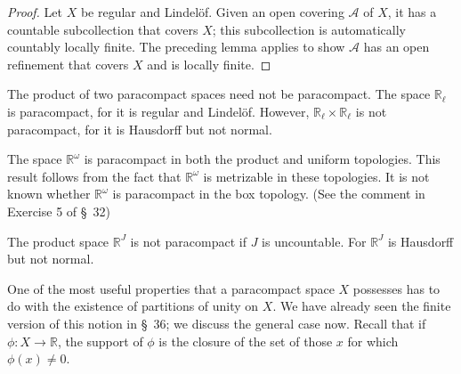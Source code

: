 \begin{proof}
 Let \(X\) be regular and Lindelöf. Given an open covering \(\mathcal{A}\) of \(X\), it has a countable subcollection that covers \(X\); this subcollection is automatically countably locally finite. The preceding lemma applies to show \(\mathcal{A}\) has an open refinement that covers \(X\) and is locally finite.
\end{proof}

\begin{centeredblock}
\begin{example}
\label{ex:\thesection.\theexample}
 The product of two paracompact spaces need not be paracompact. The space \(\mathbb{R}_{\ell }\) is paracompact, for it is regular and Lindelöf. However, \(\mathbb{R}_{\ell } \times {\mathbb{R}}_{\ell }\) is not paracompact, for it is Hausdorff but not normal.
\end{example}
\end{centeredblock}

\begin{centeredblock}
\begin{example}
\label{ex:\thesection.\theexample}
 The space \(\mathbb{R}^{\omega }\) is paracompact in both the product and uniform topologies. This result follows from the fact that \(\mathbb{R}^{\omega }\) is metrizable in these topologies. It is not known whether \(\mathbb{R}^{\omega }\) is paracompact in the box topology. (See the comment in Exercise 5 of \S\ 32)
\end{example}
\end{centeredblock}

\begin{centeredblock}
\begin{example}
\label{ex:\thesection.\theexample}
 The product space \(\mathbb{R}^{J}\) is not paracompact if \(J\) is uncountable. For \(\mathbb{R}^{J}\) is Hausdorff but not normal.
\end{example}
\end{centeredblock}

One of the most useful properties that a paracompact space \(X\) possesses has to do with the existence of partitions of unity on \(X\). We have already seen the finite version of this notion in \S\ 36; we discuss the general case now. Recall that if \(\phi : X \rightarrow \mathbb{R}\), the support of \(\phi\) is the closure of the set of those \(x\) for which \(\phi (x) \neq 0\).

